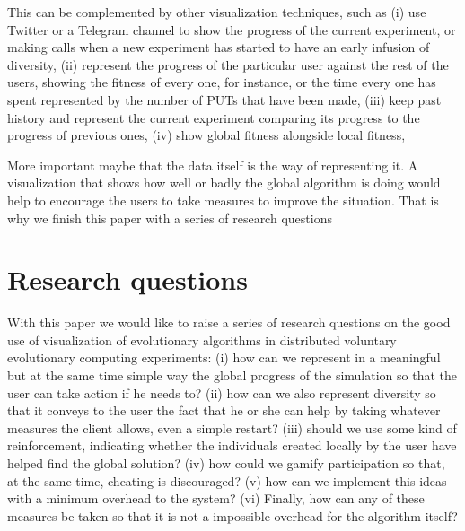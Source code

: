 \documentclass{sig-alternate}
\begin{document}
This can be complemented by other visualization techniques, such as 
(i) use Twitter or a Telegram channel to show the progress of
  the current experiment, or making calls when a new experiment has
  started to have an early infusion of diversity, 
(ii) represent the progress of the particular user against the rest
  of the users, showing the fitness of every one, for instance, or the
  time every one has spent represented by the number of PUTs that have
  been made,
(iii) keep past history and represent the current experiment comparing its
  progress to the progress of previous ones,
(iv) show global fitness alongside local fitness, 

More important maybe that the data itself is the way of representing
it. A visualization that shows how well or badly the global algorithm
is doing would help to encourage the users to take measures to improve
the situation. That is why we finish this paper with a series of
research questions

\section{Research questions}

With this paper we would like to raise a series of research questions
on the good use of visualization of evolutionary algorithms in
distributed voluntary evolutionary computing experiments:
(i) how can we represent in a meaningful but at the same time simple
  way the global progress of the simulation so that the user can take
  action if he needs to?
(ii) how can we also represent diversity so that it conveys to the
  user the fact that he or she can help by taking whatever measures
  the client allows, even a simple restart?
(iii) should we use some kind of reinforcement, indicating whether the
  individuals created locally by the user have helped find the global solution?
(iv) how could we gamify participation so that, at the same time,
  cheating is discouraged?
(v) how can we implement this ideas with a minimum overhead to the system?  
(vi) Finally, how can any of these measures be taken so that it is
  not a impossible overhead for the algorithm itself?
\end{document}
